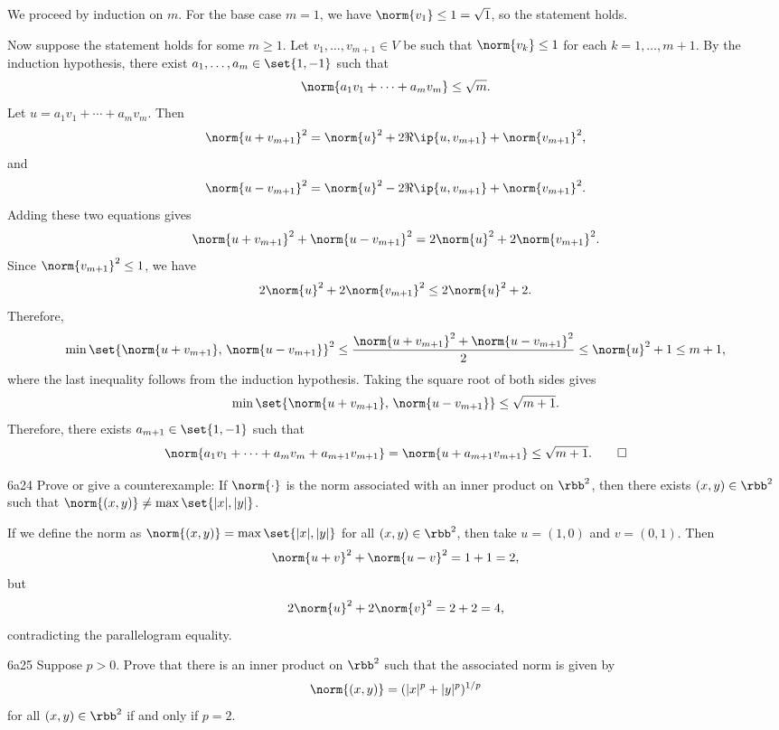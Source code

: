 \begin{sol}
    We proceed by induction on $m$.
    For the base case $m = 1$, we have $\norm{v_1} \leq 1 = \sqrt{1}$, so the statement holds.

    Now suppose the statement holds for some $m \geq 1$.
    Let $v_1, \ldots, v_{m+1} \in V$ be such that $\norm{v_k} \leq 1$ for each $k = 1, \ldots, m + 1$.
    By the induction hypothesis, there exist $a_1, \ldots, a_m \in \set{1, -1}$ such that
    \[
        \norm{a_1 v_1 + \cdots + a_m v_m} \leq \sqrt{m}.
    \]
    Let $u = a_1 v_1 + \cdots + a_m v_m$.
    Then
    \[
        \norm{u + v_{m+1}}^2 = \norm{u}^2 + 2\Re\ip{u, v_{m+1}} + \norm{v_{m+1}}^2,
    \]
    and
    \[
        \norm{u - v_{m+1}}^2 = \norm{u}^2 - 2\Re\ip{u, v_{m+1}} + \norm{v_{m+1}}^2.
    \]
    Adding these two equations gives
    \[
        \norm{u + v_{m+1}}^2 + \norm{u - v_{m+1}}^2 = 2\norm{u}^2 + 2\norm{v_{m+1}}^2.
    \]
    Since $\norm{v_{m+1}}^2 \leq 1$, we have
    \[
        2\norm{u}^2 + 2\norm{v_{m+1}}^2 \leq 2\norm{u}^2 + 2.
    \]
    Therefore,
    \[
        \min\set{\norm{u + v_{m+1}},\,\norm{u - v_{m+1}}}^2 \leq \frac{\norm{u + v_{m+1}}^2 + \norm{u - v_{m+1}}^2}{2} \leq \norm{u}^2 + 1 \leq m + 1,
    \]
    where the last inequality follows from the induction hypothesis.
    Taking the square root of both sides gives
    \[
        \min\set{\norm{u + v_{m+1}},\,\norm{u - v_{m+1}}} \leq \sqrt{m + 1}.
    \]
    Therefore, there exists $a_{m+1} \in \set{1, -1}$ such that
    \[
        \norm{a_1 v_1 + \cdots + a_m v_m + a_{m+1} v_{m+1}} = \norm{u + a_{m+1} v_{m+1}} \leq \sqrt{m + 1}. \qedhere
    \]
\end{sol}

\begin{exercise}{6a24}
    Prove or give a counterexample: If $\norm{\cdot}$ is the norm associated with an inner product on $\rbb^2$, then there exists $(x, y) \in \rbb^2$ such that $\norm{(x, y)} \neq \max\set{|x|, |y|}$.
\end{exercise}

\begin{sol}
    If we define the norm as $\norm{(x, y)} = \max\set{|x|, |y|}$ for all $(x, y) \in \rbb^2$, then take $u = (1, 0)$ and $v = (0, 1)$.
    Then
    \[
        \norm{u + v}^2 + \norm{u - v}^2 = 1 + 1 = 2,
    \]
    but
    \[
        2\norm{u}^2 + 2\norm{v}^2 = 2 + 2 = 4,
    \]
    contradicting the parallelogram equality.
\end{sol}

\begin{exercise}{6a25}
    Suppose $p > 0$.
    Prove that there is an inner product on $\rbb^2$ such that the associated norm is given by
    \[
        \norm{(x, y)} = (|x|^p + |y|^p)^{1/p}
    \]
    for all $(x, y) \in \rbb^2$ if and only if $p = 2$.
\end{exercise}

